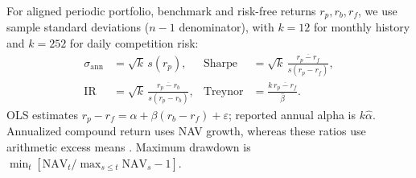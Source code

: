 For aligned periodic portfolio, benchmark and risk-free returns \(r_p,r_b,r_f\),
we use sample standard deviations (\(n-1\) denominator), with \(k=12\) for
monthly history and \(k=252\) for daily competition risk:
\begin{align}
 \sigma_{\mathrm{ann}}&=\sqrt{k}\,s(r_p),&
 \mathrm{Sharpe}&=\sqrt{k}\,\frac{\overline{r_p-r_f}}{s(r_p-r_f)},\\
 \mathrm{IR}&=\sqrt{k}\,\frac{\overline{r_p-r_b}}{s(r_p-r_b)},&
 \mathrm{Treynor}&=\frac{k\,\overline{r_p-r_f}}{\widehat{\beta}}.
\end{align}
OLS estimates \(r_p-r_f=\alpha+\beta(r_b-r_f)+\varepsilon\);
reported annual alpha is \(k\widehat{\alpha}\). Annualized compound return uses NAV growth,
whereas these ratios use arithmetic excess means
\citep{sharpe1994,kidd2011}. Maximum drawdown is
\(\min_t[\mathrm{NAV}_t/\max_{s\le t}\mathrm{NAV}_s-1]\).
